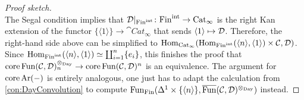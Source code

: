 \begin{proof}[Proof sketch]
\begin{equation*}
	\end{equation*}
	The Segal condition implies that $\mathcal{D}|_{\mathrm{Fin}^\mathrm{int}}\colon \mathrm{Fin}^\mathrm{int}\rightarrow \mathrm{Cat}_\infty$ is the right Kan extension of the functor $\{\langle 1\rangle\}\rightarrow \cat{Cat}_\infty$ that sends $\langle 1\rangle\mapsto \mathcal{D}$. Therefore, the right-hand side above can be simplified to $\operatorname{Hom}_{\mathrm{Cat}_\infty}(\operatorname{Hom}_{\mathrm{Fin}^\mathrm{int}}(\langle n\rangle,\langle 1\rangle)\times\mathcal{C},\mathcal{D})$. Since $\operatorname{Hom}_{\mathrm{Fin}^\mathrm{int}}(\langle n\rangle,\langle 1\rangle)\simeq \coprod_{i=1}^n\{e_i\}$, this finishes the proof that $\operatorname{core} \operatorname{Fun}(\mathcal{C},\mathcal{D})^{\otimes_{\mathrm{Day}}}_n\rightarrow \operatorname{core}\operatorname{Fun}(\mathcal{C},\mathcal{D})^n$ is an equivalence. The argument for $\operatorname{core}\operatorname{Ar}(-)$ is entirely analogous, one just has to adapt the calculation from \cref{con:DayConvolution} to compute $\Fun_{\cat{Fin}}(\Delta^1\times\{\langle n\rangle\},\ov{\Fun}(\Cc,\Dd)^{\otimes_{\mathrm{Day}}})$ instead.
\end{proof}
